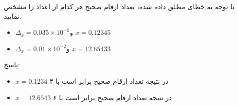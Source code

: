 با توجه به خطای مطلق داده شده، تعداد ارقام صحیح هر کدام از اعداد را مشخص نمایید.

\begin{itemize}
    \item $\Delta_{x} = 0.035 \times 10^{-2}$و $x = 0.12345$
    \item $\Delta_{x} = 0.01 \times 10^{-2}$و $x = 12.65433$
\end{itemize}


پاسخ: \\
\begin{itemize}
    \item $x = 0.1234$  در نتیجه تعداد ارقام صحیح برابر است با ۴
    \item $x = 12.6543$ در نتیجه تعداد ارقام صحیح برابر است با ۶
\end{itemize}